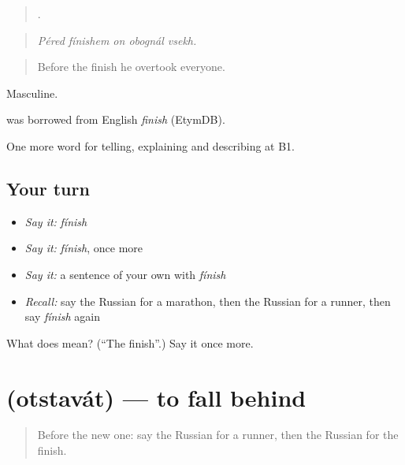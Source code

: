 \begin{quote}
    .
\end{quote}

\begin{quote}
\emph{Péred fínishem on obognál vsekh.}
\end{quote}

\begin{quote}
Before the finish he overtook everyone.
\end{quote}

Masculine.

\begin{cousinweb}
\emph{} was borrowed from English \emph{finish} (EtymDB).
\end{cousinweb}

\begin{grammarlens}[title={What you've built}]
One more word for telling, explaining and describing at B1.
\end{grammarlens}

\subsection*{Your turn}
\begin{itemize}
\raggedright
  \item \emph{Say it:} \emph{fínish}
  \item \emph{Say it:} \emph{fínish}, once more
  \item \emph{Say it:} a sentence of your own with \emph{fínish}
  \item \emph{Recall:} say the Russian for a marathon, then the Russian for a runner, then say \emph{fínish} again
\end{itemize}

\begin{tcolorbox}[breakable,colback=teal!4,colframe=teal!35!black,title={Before you move on}]
What does  mean? (\textquotedblleft{}The finish\textquotedblright{}.) Say it once more.
\end{tcolorbox}
\section[\texorpdfstring{\ru{отставать} (otstavát)}{отставать (otstavát)}]{ (otstavát) — to fall behind}

\label{lesson:RU-C512-otstavat}



\begin{quote}
Before the new one: say the Russian for a runner, then the Russian for the finish.
\end{quote}

